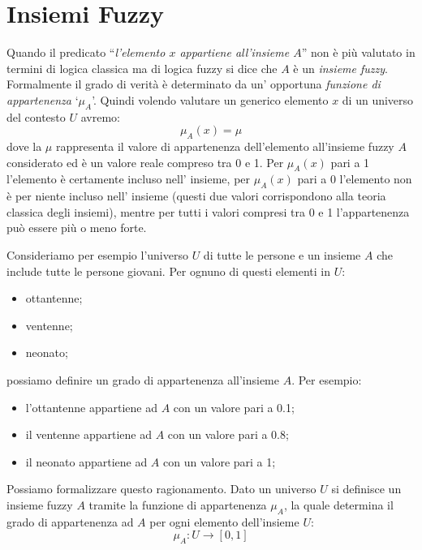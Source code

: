 \documentclass[a4paper,12pt]{report}
\begin{document}
\section{Insiemi Fuzzy}
Quando il predicato ``\textit{l'elemento $x$ appartiene all'insieme $A$}'' non è  più valutato in termini di logica classica ma di logica fuzzy si dice che $A$ è un \textit{insieme fuzzy}. 
Formalmente il grado di verità è determinato da un' opportuna \textit{funzione di appartenenza} `$\mu_A$'. Quindi volendo valutare un generico elemento $x$ di un universo del contesto $U$ avremo:
\begin{equation*}
    \mu_A(x) = \mu
\end{equation*}
\noindent 
dove la $\mu$ rappresenta il valore di appartenenza dell'elemento all'insieme fuzzy $A$ considerato ed è un valore reale compreso tra 0 e 1. 
Per $\mu_A(x)$ pari a 1 l’elemento è certamente incluso nell’ insieme, per $\mu_A(x)$ pari a 0
l’elemento non è per niente incluso nell’ insieme (questi due valori corrispondono alla teoria classica degli insiemi), mentre per tutti i valori compresi tra 0 e 1 l’appartenenza può essere più o meno forte.

\bigskip

Consideriamo per esempio l'universo $U$ di tutte le persone e un insieme $A$ che include tutte le persone giovani. Per ognuno di questi elementi in $U$:
\begin{itemize}
    \item ottantenne;
    \item ventenne;
    \item neonato;
\end{itemize}
possiamo definire un grado di appartenenza all'insieme $A$. Per esempio:
\begin{itemize}
    \item l'ottantenne appartiene ad $A$ con un valore pari a 0.1;
    \item il ventenne appartiene ad $A$ con un valore pari a 0.8;
    \item il neonato appartiene ad $A$ con un valore pari a 1;
\end{itemize}
Possiamo formalizzare questo ragionamento.
Dato un universo $U$ si definisce un insieme fuzzy $A$ tramite la funzione di appartenenza $\mu_A$, la quale determina il grado di appartenenza ad $A$ per ogni elemento dell'insieme $U$:
\begin{equation*}
    \mu_A : U \to [0,1]
\end{equation*}
\end{document}
